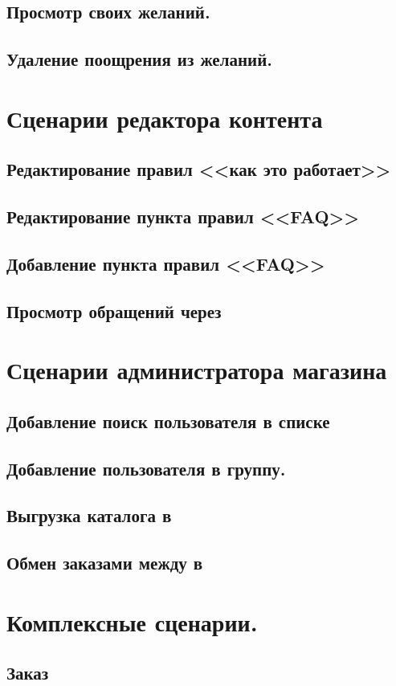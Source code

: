         \subsection{Просмотр своих желаний.}
        \subsection{Удаление поощрения из желаний.}

    \section{Сценарии редактора контента}

        \subsection{Редактирование правил <<как это работает>>}
        \subsection{Редактирование пункта правил <<FAQ>>}
        \subsection{Добавление пункта правил <<FAQ>>}
        \subsection{Просмотр обращений через }

    \section{Сценарии администратора магазина}

        \subsection{Добавление поиск пользователя в списке}
        \subsection{Добавление пользователя в группу.}
        \subsection{Выгрузка каталога  в }
        \subsection{Обмен заказами между  в }


    \section{Комплексные сценарии.}
        
        \subsection{Заказ}




